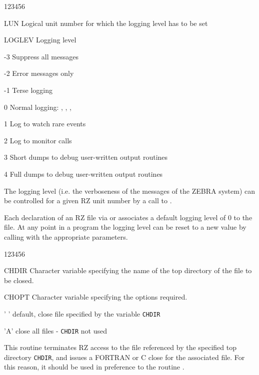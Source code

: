 \begin{DLtt}{123456}
\item[LUN]Logical unit number for which the logging level has to be set
\item[LOGLEV]Logging level
\begin{DLtt}{12}
\item[-3]Suppress all messages
\item[-2]Error messages only
\item[-1]Terse logging
\item[ 0]Normal logging: , , , 
\item[ 1]Log to watch rare events
\item[ 2]Log to monitor calls
\item[ 3]Short dumps to debug user-written output routines
\item[ 4]Full dumps to debug user-written output routines
\end{DLtt}
\end{DLtt}

The logging level
(i.e. the verboseness of the messages of the ZEBRA system) can be
controlled for a given RZ unit number by a call to .

Each declaration of an RZ file via  or 
associates a default logging level of 0 to the file.
At any point in a program the logging level can be reset to a new
value by calling  with the appropriate parameters.



\begin{DLtt}{123456}
\item[CHDIR]Character variable specifying the name of the top directory of the
file to be closed.
\item[CHOPT]Character variable specifying the options required.
\begin{DLtt}{12}
\item[' ']  default, close file specified by the variable {\tt CHDIR}
\item['A']  close all files - {\tt CHDIR} not used
\end{DLtt}
\end{DLtt}

This routine terminates RZ access to the file referenced
by the specified top directory {\tt CHDIR}, and issues a FORTRAN
or C close for the associated file. For this reason,
it should be used in preference to the routine .

